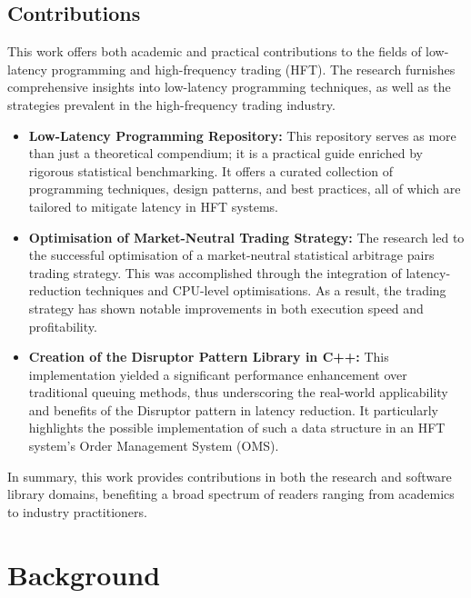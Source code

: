 \documentclass{article}
\theoremstyle{break}
\begin{document}
\subsection{Contributions}

This work offers both academic and practical contributions to the fields of low-latency programming and high-frequency trading (HFT). The research furnishes comprehensive insights into low-latency programming techniques, as well as the strategies prevalent in the high-frequency trading industry. 

\begin{itemize}
    \item \textbf{Low-Latency Programming Repository:} This repository serves as more than just a theoretical compendium; it is a practical guide enriched by rigorous statistical benchmarking. It offers a curated collection of programming techniques, design patterns, and best practices, all of which are tailored to mitigate latency in HFT systems.

    \item \textbf{Optimisation of Market-Neutral Trading Strategy:} The research led to the successful optimisation of a market-neutral statistical arbitrage pairs trading strategy. This was accomplished through the integration of latency-reduction techniques and CPU-level optimisations. As a result, the trading strategy has shown notable improvements in both execution speed and profitability.

    \item \textbf{Creation of the Disruptor Pattern Library in C++:} This implementation yielded a significant performance enhancement over traditional queuing methods, thus underscoring the real-world applicability and benefits of the Disruptor pattern in latency reduction. It particularly highlights the possible implementation of such a data structure in an HFT system's Order Management System (OMS).
\end{itemize}

\noindent In summary, this work provides contributions in both the research and software library domains, benefiting a broad spectrum of readers ranging from academics to industry practitioners.


\section{Background}
\end{document}
